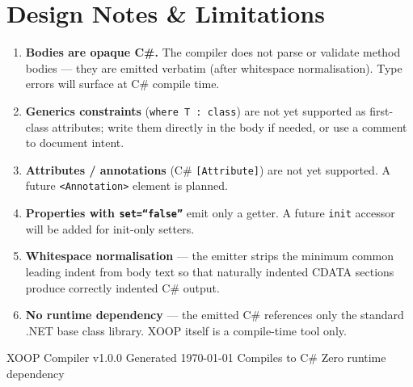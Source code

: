 \documentclass[11pt,a4paper]{article}
\newcommand{\el}[1]{\texttt{\textcolor{xoop-keyword}{<#1>}}}
\newcommand{\attr}[1]{\texttt{\textcolor{xoop-attr}{#1}}}
\newcommand{\cs}[1]{\texttt{#1}}
\begin{document}
\section{Design Notes \& Limitations}

\begin{enumerate}
  \item \textbf{Bodies are opaque C\#.} The compiler does not parse or validate
        method bodies — they are emitted verbatim (after whitespace normalisation).
        Type errors will surface at C\# compile time.

  \item \textbf{Generics constraints} (\cs{where T : class}) are not yet
        supported as first-class attributes; write them directly in the body
        if needed, or use a comment to document intent.

  \item \textbf{Attributes / annotations} (C\# \cs{[Attribute]}) are not yet
        supported. A future \el{Annotation} element is planned.

  \item \textbf{Properties with \attr{set=``false''}} emit only a getter.
        A future \attr{init} accessor will be added for init-only setters.

  \item \textbf{Whitespace normalisation} — the emitter strips the minimum
        common leading indent from body text so that naturally indented CDATA
        sections produce correctly indented C\# output.

  \item \textbf{No runtime dependency} — the emitted C\# references only the
        standard .NET base class library. XOOP itself is a compile-time tool only.
\end{enumerate}

\vfill
\begin{center}
  \small\textcolor{xoop-gray}{XOOP Compiler v1.0.0 \quad\textbullet\quad
  Generated \today \quad\textbullet\quad
  Compiles to C\# \textbullet\quad Zero runtime dependency}
\end{center}
\end{document}
